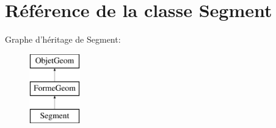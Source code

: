 \hypertarget{class_segment}{\section{Référence de la classe Segment}
\label{class_segment}
}
Graphe d'héritage de Segment\+:\begin{figure}[H]
\begin{center}
\leavevmode
\includegraphics[height=3.000000cm]{class_segment}
\end{center}
\end{figure}
